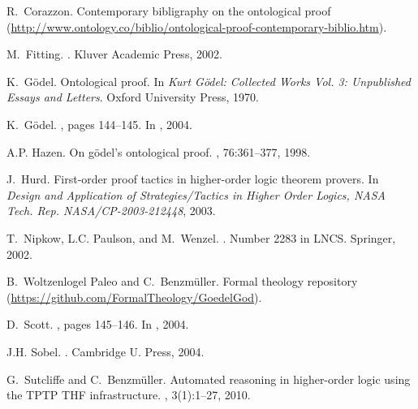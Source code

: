 \documentclass{llncs}
\begin{document}
\begin{thebibliography}{10}
R.~Corazzon.
\newblock Contemporary bibligraphy on the ontological proof
  (\url{http://www.ontology.co/biblio/ontological-proof-contemporary-biblio.htm}).

M.~Fitting.
.
\newblock Kluver Academic Press, 2002.

K.~G\"odel.
\newblock Ontological proof.
\newblock In {\em {Kurt G\"odel: Collected Works Vol. 3: Unpublished Essays and
  Letters}}. Oxford University Press, 1970.

K.~G\"odel.
, pages 144--145.
\newblock In  \cite{sobel2004logic}, 2004.

A.P. Hazen.
\newblock On g\"odel's ontological proof.
, 76:361--377, 1998.

J.~Hurd.
\newblock First-order proof tactics in higher-order logic theorem provers.
\newblock In {\em Design and Application of Strategies/Tactics in Higher Order
  Logics, NASA Tech. Rep. NASA/CP-2003-212448}, 2003.

T.~Nipkow, L.C. Paulson, and M.~Wenzel.
.
\newblock Number 2283 in LNCS. Springer, 2002.

B.~Woltzenlogel Paleo and C.~Benzm\"uller.
\newblock Formal theology repository
  (\url{https://github.com/FormalTheology/GoedelGod}).

D.~Scott.
, pages 145--146.
\newblock In  \cite{sobel2004logic}, 2004.

J.H. Sobel.
.
\newblock Cambridge U. Press, 2004.

G.~Sutcliffe and C.~Benzm{\"u}ller.
\newblock Automated reasoning in higher-order logic using the {TPTP THF}
  infrastructure.
, 3(1):1--27, 2010.

\end{thebibliography}
\end{document}
